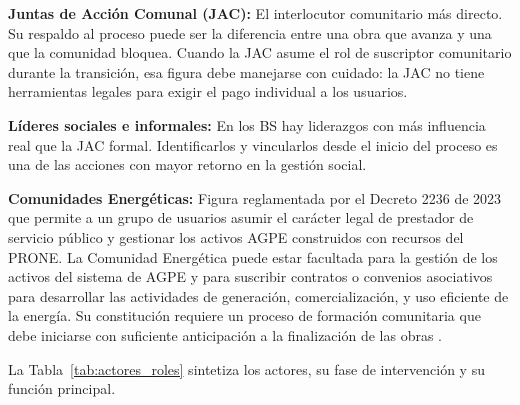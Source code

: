 \textbf{Juntas de Acción Comunal (JAC):} El interlocutor comunitario
más directo. Su respaldo al proceso puede ser la diferencia entre una
obra que avanza y una que la comunidad bloquea. Cuando la JAC asume el
rol de suscriptor comunitario durante la transición, esa figura debe
manejarse con cuidado: la JAC no tiene herramientas legales para exigir
el pago individual a los usuarios.

\textbf{Líderes sociales e informales:} En los BS hay liderazgos con
más influencia real que la JAC formal. Identificarlos y vincularlos
desde el inicio del proceso es una de las acciones con mayor retorno
en la gestión social.

\textbf{Comunidades Energéticas:} Figura reglamentada por el Decreto
2236 de 2023 que permite a un grupo de usuarios asumir el carácter
legal de prestador de servicio público y gestionar los activos AGPE
construidos con recursos del PRONE. La Comunidad Energética puede estar
facultada para la gestión de los activos del sistema de AGPE y para
suscribir contratos o convenios asociativos para desarrollar las
actividades de generación, comercialización, y uso eficiente de la
energía. Su constitución requiere un proceso de formación comunitaria
que debe iniciarse con suficiente anticipación a la finalización de las
obras \parencite{Decreto2236_2023}.

La Tabla~\ref{tab:actores_roles} sintetiza los actores, su fase de
intervención y su función principal.

